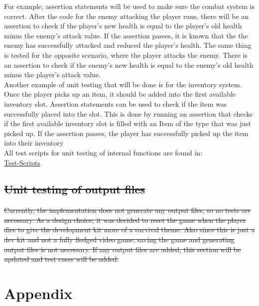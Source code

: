 \documentclass[12pt, titlepage]{article}
\DeclareRobustCommand{\hsout}[1]{\texorpdfstring{\sout{#1}}{#1}}
\begin{document}
For example, assertion statements will be used to make sure the combat system is correct. After the code for the enemy attacking the player runs, there will be an assertion to check if the player's new health is equal to the player's old health minus the enemy's attack value. If the assertion passes, it is known that the the enemy has successfully attacked and reduced the player's health. The same thing is tested for the opposite scenario, where the player attacks the enemy. There is an assertion to check if the enemy's new health is equal to the enemy's old health minus the player's attack value. \\

Another example of unit testing that will be done is for the inventory system. Once the player picks up an item, it should be added into the first available inventory slot. Assertion statements can be used to check if the item was successfully placed into the slot. This is done by running an assertion that checks if the first available inventory slot is filled with an Item of the type that was just picked up. If the assertion passes, the player has successfully picked up the item into their inventory\\

{\color{magenta} All test scripts for unit testing of internal functions are found in: \\
\href{https://gitlab.cas.mcmaster.ca/jonatans/Zombie\_Survival\_Kit/tree/Brian\_Final/src/Zombie\%20Survival\%20Kit/Assets/Scripts/Test\%20Scripts}{Test-Scripts} \\}

\subsection{\hsout{Unit testing of output files}}		

\sout{Currently, the implementation does not generate any output files, so no tests are necessary. As a design choice, it was decided to reset the game when the player dies to give the development kit more of a survival theme. Also since this is just a dev kit and not a fully fledged video game, saving the game and generating output files is not necessary. If any output files are added, this section will be updated and test cases will be added.}



%
%
%
%
%
\section{Appendix}
\end{document}
